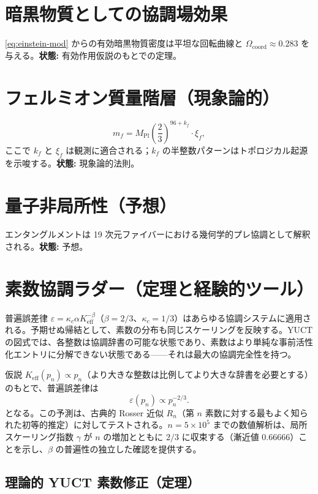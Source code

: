 \documentclass[11pt,a4paper]{article}
\newcommand{\coord}{\mathrm{coord}}
\begin{document}
	\section{暗黒物質としての協調場効果}
	\label{sec:DM}
	\eqref{eq:einstein-mod} からの有効暗黒物質密度は平坦な回転曲線と \(\Omega_{\coord} \approx 0.283\) を与える。\textbf{状態:} 有効作用仮説のもとでの定理。
	
	\section{フェルミオン質量階層（現象論的）}
	\label{sec:masses}
	\[
	m_f = M_{\mathrm{Pl}} \left(\frac{2}{3}\right)^{96 + k_f} \cdot \xi_f,
	\]
	ここで \(k_f\) と \(\xi_f\) は観測に適合される；\(k_f\) の半整数パターンはトポロジカル起源を示唆する。\textbf{状態:} 現象論的法則。
	
	\section{量子非局所性（予想）}
	\label{sec:nonlocality}
	エンタングルメントは 19 次元ファイバーにおける幾何学的プレ協調として解釈される。\textbf{状態:} 予想。
	
	\section{素数協調ラダー（定理と経験的ツール）}
	\label{sec:primes}
	
	普遍誤差律 \(\varepsilon = \kappa_c\alpha K_{\mathrm{eff}}^{-\beta}\)（\(\beta=2/3\)、\(\kappa_c=1/3\)）はあらゆる協調システムに適用される。予期せぬ帰結として、素数の分布も同じスケーリングを反映する。YUCT の図式では、各整数は協調辞書の可能な状態であり、素数はより単純な事前活性化エントリに分解できない状態である——それは最大の協調完全性を持つ。
	
	仮説 \(K_{\mathrm{eff}}(p_n) \propto p_n\)（より大きな整数は比例してより大きな辞書を必要とする）のもとで、普遍誤差律は
	\[
	\varepsilon(p_n) \propto p_n^{-2/3}.
	\]
	となる。この予測は、古典的 Rosser 近似 \(R_n\)（第 \(n\) 素数に対する最もよく知られた初等的推定）に対してテストされる。\(n = 5\times10^5\) までの数値解析は、局所スケーリング指数 \(\gamma\) が \(n\) の増加とともに \(2/3\) に収束する（漸近値 \(0.66666\)）ことを示し、\(\beta\) の普遍性の独立した確認を提供する。
	
	\subsection{理論的 YUCT 素数修正（定理）}
	
\end{document}
